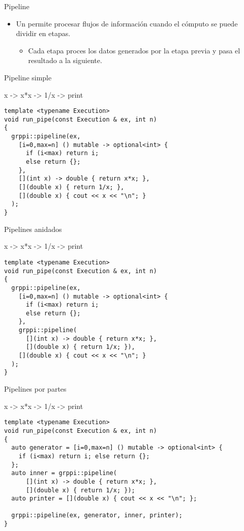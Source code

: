 \begin{frame}[t]{Pipeline}
\begin{itemize}
  \item Un  
        permite procesar flujos de información cuando el cómputo se puede dividir en etapas.
    \begin{itemize}
      \item Cada etapa proces los datos generados por la etapa previa y pasa el resultado
            a la siguiente.
    \end{itemize}
\end{itemize}
\end{frame}

\begin{frame}[t,fragile]{Pipeline simple}
\begin{block}{x -> x*x -> 1/x -> print}
\begin{lstlisting}
template <typename Execution>
void run_pipe(const Execution & ex, int n)
{
  grppi::pipeline(ex,
    [i=0,max=n] () mutable -> optional<int> {
      if (i<max) return i;
      else return {};
    },
    [](int x) -> double { return x*x; },
    [](double x) { return 1/x; },
    [](double x) { cout << x << "\n"; }
  );
}
\end{lstlisting}
\end{block}
\end{frame}

\begin{frame}[t,fragile]{Pipelines anidados}
\begin{block}{x -> x*x -> 1/x -> print}
\begin{lstlisting}
template <typename Execution>
void run_pipe(const Execution & ex, int n)
{
  grppi::pipeline(ex,
    [i=0,max=n] () mutable -> optional<int> {
      if (i<max) return i;
      else return {};
    },
    grppi::pipeline(
      [](int x) -> double { return x*x; },
      [](double x) { return 1/x; }),
    [](double x) { cout << x << "\n"; }
  );
}
\end{lstlisting}
\end{block}
\end{frame}

\begin{frame}[t,fragile]{Pipelines por partes}
\begin{block}{x -> x*x -> 1/x -> print}
\begin{lstlisting}
template <typename Execution>
void run_pipe(const Execution & ex, int n)
{
  auto generator = [i=0,max=n] () mutable -> optional<int> {
    if (i<max) return i; else return {};
  };
  auto inner = grppi::pipeline(
      [](int x) -> double { return x*x; },
      [](double x) { return 1/x; });
  auto printer = [](double x) { cout << x << "\n"; };

  grppi::pipeline(ex, generator, inner, printer);
}
\end{lstlisting}
\end{block}
\end{frame}
